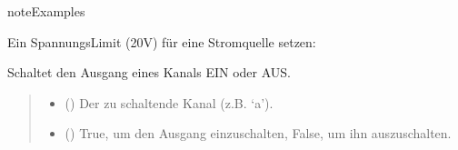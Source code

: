 \documentclass[letterpaper,10pt,english]{sphinxmanual}
\begin{document}
\begin{fulllineitems}
\begin{fulllineitems}
\begin{sphinxadmonition}{note}{Examples}
\begin{sphinxVerbatim}[commandchars=\\\{\}]
 
\end{sphinxVerbatim}

\sphinxAtStartPar
Ein Spannungs\sphinxhyphen{}Limit (20V) für eine Stromquelle setzen:

\begin{sphinxVerbatim}[commandchars=\\\{\}]

 
\end{sphinxVerbatim}
\end{sphinxadmonition}

\end{fulllineitems}


\begin{fulllineitems}
\label{\detokenize{modulab/smu_manager:modules.smu.SmuManager.SmuManager.set_output_state}}
\pysigstartsignatures
\pysiglinewithargsret
{}
{\sphinxparamcomma {}}
{}
\pysigstopsignatures
\sphinxAtStartPar
Schaltet den Ausgang eines Kanals EIN oder AUS.
\begin{quote}\begin{description}
\begin{itemize}
\item {} 
\sphinxAtStartPar
{} () \textendash{} Der zu schaltende Kanal (z.B. ‘a’).

\item {} 
\sphinxAtStartPar
{} () \textendash{} True, um den Ausgang einzuschalten, False, um ihn auszuschalten.


\end{itemize}
\end{description}
\end{quote}
\end{fulllineitems}
\end{fulllineitems}
\end{document}
